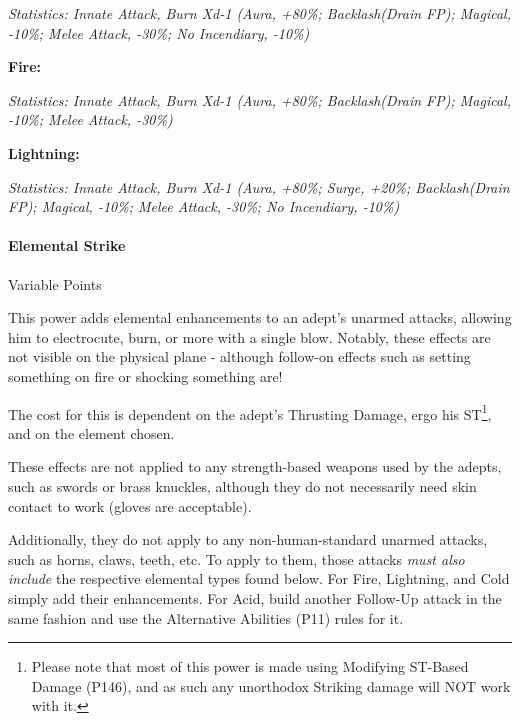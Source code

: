 \begin{multicols*}{3}
	\textcolor{OliveGreen}{\textit{Statistics: Innate Attack, Burn Xd-1 (Aura, +80\%; Backlash(Drain FP); Magical, -10\%; Melee Attack, -30\%; No Incendiary, -10\%) }}
	
	\textbf{Fire:}
	
	\textcolor{OliveGreen}{\textit{Statistics: Innate Attack, Burn Xd-1 (Aura, +80\%; Backlash(Drain FP); Magical, -10\%; Melee Attack, -30\%) }}
	
	\textbf{Lightning:}
	
	\textcolor{OliveGreen}{\textit{Statistics: Innate Attack, Burn Xd-1 (Aura, +80\%; Surge, +20\%; Backlash(Drain FP); Magical, -10\%; Melee Attack, -30\%; No Incendiary, -10\%) }}

	\paragraph{Elemental Strike}
	\begin{flushright}
		Variable Points
	\end{flushright}

	This power adds elemental enhancements to an adept's unarmed attacks, allowing him to electrocute, burn, or more with a single blow. Notably, these effects are not visible on the physical plane - although follow-on effects such as setting something on fire or shocking something are!
	
	The cost for this is dependent on the adept's Thrusting Damage, ergo his ST\footnote{Please note that most of this power is made using Modifying ST-Based Damage (P146), and as such any unorthodox Striking damage will NOT work with it.}, and on the element chosen.
	
	These effects are not applied to any strength-based weapons used by the adepts, such as swords or brass knuckles, although they do not necessarily need skin contact to work (gloves are acceptable).
	
	Additionally, they do not apply to any non-human-standard unarmed attacks, such as horns, claws, teeth, etc. To apply to them, those attacks \textit{must also include} the respective elemental types found below. For Fire, Lightning, and Cold simply add their enhancements. For Acid, build another Follow-Up attack in the same fashion and use the Alternative Abilities (P11) rules for it.
	

\end{multicols*}
